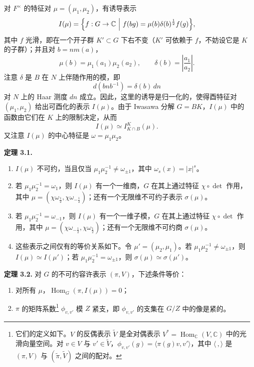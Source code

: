 对 $F^\times$ 的特征对 $\mu=(\mu_1,\mu_2)$，有诱导表示
\[
I(\mu)=\Bigl\{f:G\to\mathbb{C}\ \Big|\ f(bg)=\mu(b)\delta(b)^{\frac12}f(g)\Bigr\},
\]
其中 $f$ 光滑，即在一个开子群 $K'\subset G$ 下右不变（$K'$ 可依赖于 $f$，不妨设它是 $K$ 的子群）；并且对 $b=nm(a)$，
\[
\mu(b)=\mu_1(a_1)\mu_2(a_2),\qquad \delta(b)=\left|\frac{a_1}{a_2}\right|.
\]
注意 $\delta$ 是 $B$ 在 $N$ 上伴随作用的模，即
\[
d(bnb^{-1})=\delta(b)\,dn
\]
对 $N$ 上的 Haar 测度 $dn$ 成立。因此，这里的诱导是归一化的，使得酉特征对 $(\mu_1,\mu_2)$ 给出可酉化的表示 $I(\mu)$。由于 Iwasawa 分解 $G=BK$，$I(\mu)$ 中的函数由它们在 $K$ 上的限制决定，从而
\[
I(\mu)\simeq I^K_{K\cap B}(\mu).
\]
又注意 $I(\mu)$ 的中心特征是 $\omega=\mu_1\mu_2$。

\medskip\noindent\textbf{定理 3.1.}\quad
\begin{enumerate}[label=(\roman*),leftmargin=2.4em,itemsep=0.15em,topsep=0.25em]
\item $I(\mu)$ 不可约，当且仅当 $\mu_1\mu_2^{-1}\ne\omega_{\pm1}$，其中 $\omega_s(x)=|x|^s$。
\item 若 $\mu_1\mu_2^{-1}=\omega_1$，则 $I(\mu)$ 有一个一维商，$G$ 在其上通过特征 $\chi\circ\det$ 作用，其中 $\mu=(\chi\omega_{\frac12},\chi\omega_{-\frac12})$；还有一个无限维不可约子表示 $\sigma(\mu)$。
\item 若 $\mu_1\mu_2^{-1}=\omega_{-1}$，则 $I(\mu)$ 有一个一维子模，$G$ 在其上通过特征 $\chi\circ\det$ 作用，其中 $\mu=(\chi\omega_{-\frac12},\chi\omega_{\frac12})$；还有一个无限维不可约商 $\sigma(\mu)$。
\item 这些表示之间仅有的等价关系如下。令 $\mu'=(\mu_2,\mu_1)$。若 $\mu_1\mu_2^{-1}\ne\omega_{\pm1}$，则 $I(\mu)\simeq I(\mu')$；若 $\mu_1\mu_2^{-1}=\omega_{\pm1}$，则 $\sigma(\mu)\simeq\sigma(\mu')$。
\end{enumerate}

\medskip\noindent\textbf{定理 3.2.}\quad
对 $G$ 的不可约容许表示 $(\pi,V)$，下述条件等价：
\begin{enumerate}[label=(\roman*),leftmargin=2.4em,itemsep=0.15em,topsep=0.25em]
\item 对所有 $\mu$，$\operatorname{Hom}_G(\pi,I(\mu))=0$；
\item $\pi$ 的矩阵系数\footnote{它们的定义如下。$V$ 的反偶表示 $\tilde V$ 是全对偶表示 $V^*=\operatorname{Hom}_{\mathbb{C}}(V,\mathbb{C})$ 中的光滑向量空间。对 $v\in V$ 与 $v'\in\tilde V$，$\phi_{v,v'}(g)=\langle\pi(g)v,v'\rangle$，其中 $\langle\,,\rangle$ 是 $(\pi,V)$ 与 $(\tilde\pi,\tilde V)$ 之间的配对。} $\phi_{v,v'}$ 模 $Z$ 紧支，即 $\phi_{v,v'}$ 的支集在 $G/Z$ 中的像是紧的。
\end{enumerate}

